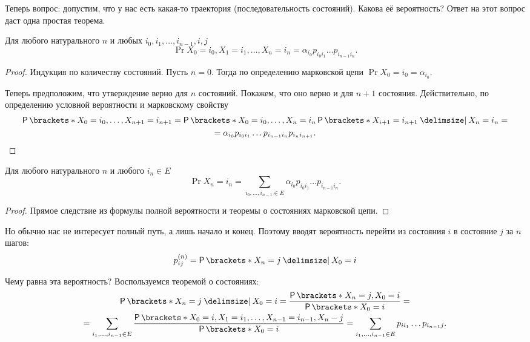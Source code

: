 Теперь вопрос: допустим, что у нас есть какая-то траектория (последовательность 
состояний). Какова её вероятность? Ответ на этот вопрос даст одна простая 
теорема.
\begin{theorem}
	Для любого натурального \(n\) и любых \(i_{0}, i_{1}, \dots, i_{n - 1}, i, 
	j\)
	\[
		\Pr{X_{0} = i_{0}, X_{1} = i_{1}, \dots, X_{n} = i_{n}} = 
		\alpha_{i_{0}} p_{i_{0}i_{1}} \ldots p_{i_{n - 1}i_{n}}.
	\]
\end{theorem}
\begin{proof}
	Индукция по количеству состояний. Пусть \(n = 0\). Тогда по определению 
	марковской цепи \(\Pr{X_{0} = i_{0}} = \alpha_{i_{0}}\).
	
	Теперь предположим, что утверждение верно для \(n\) состояний. Покажем, что 
	оно верно и для \(n + 1\) состояния. Действительно, по определению условной 
	вероятности и марковскому свойству
	\begin{multline*}
		\Pr{X_{0} = i_{0}, \dots, X_{n + 1} = i_{n + 1}} = \Pr{X_{0} = i_{0},  
		\dots, X_{n} = i_{n}}\Pr{X_{i + 1} = i_{n + 1} \given X_{n} = i_{n}} = 
		\\ = \alpha_{i_{0}} p_{i_{0}i_{1}} \ldots p_{i_{n - 1}i_{n}} 
		p_{i_{n}i_{n + 1}}. \qedhere
	\end{multline*}
\end{proof}
\begin{consequence}
	Для любого натурального \(n\) и любого \(i_{n} \in E\)
	\[
		\Pr{X_{n} = i_{n}} = \sum_{i_{0}, \ldots, i_{n - 1} \in E} 
		\alpha_{i_{0}} p_{i_{0}i_{1}} \ldots p_{i_{n - 1}i_{n}}.
	\]
\end{consequence}
\begin{proof}
	Прямое следствие из формулы полной вероятности и теоремы о состояниях 
	марковской цепи.
\end{proof}

Но обычно нас не интересует полный путь, а лишь начало и конец. Поэтому вводят 
вероятность перейти из состояния \(i\) в состояние \(j\) за \(n\) шагов:
\[
	p_{ij}^{(n)} = \Pr{X_{n} = j \given X_{0} = i}
\]

Чему равна эта вероятность? Воспользуемся теоремой о состояниях:
\begin{multline*}
	\Pr{X_{n} = j \given X_{0} = i} = \frac{\Pr{X_{n} = j, X_{0} = 
	i}}{\Pr{X_{0} = i}} = \\ = \sum_{i_{1}, \ldots, i_{n - 1} \in E} 
	\frac{\Pr{X_{0} = i, X_{1} = i_{1}, \dots, X_{n - 1} = i_{n - 1}, X_{n} - 
	j}}{\Pr{X_{0} = i}} = \sum_{i_{1}, \ldots, i_{n - 1} \in E} p_{ii_{1}} 
	\ldots p_{i_{n - 1}j}.
\end{multline*}

